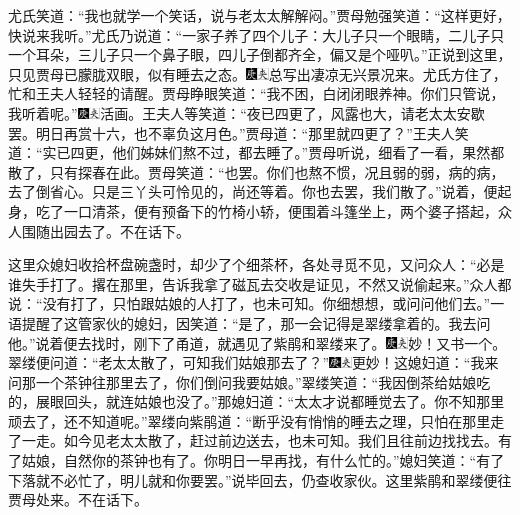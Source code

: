 尤氏笑道：“我也就学一个笑话，说与老太太解解闷。”贾母勉强笑道：“这样更好，快说来我听。”尤氏乃说道：“一家子养了四个儿子：大儿子只一个眼睛，二儿子只一个耳朵，三儿子只一个鼻子眼，四儿子倒都齐全，偏又是个哑叭。”正说到这里，只见贾母已朦胧双眼，似有睡去之态。{\includegraphics[width=3mm]{../Images/00004}\includegraphics[width=3mm]{../Images/00012}\footnotesize \kaishu 总写出凄凉无兴景况来。}尤氏方住了，忙和王夫人轻轻的请醒。贾母睁眼笑道：“我不困，白闭闭眼养神。你们只管说，我听着呢。”{\includegraphics[width=3mm]{../Images/00004}\includegraphics[width=3mm]{../Images/00012}\footnotesize \kaishu 活画。}王夫人等笑道：“夜已四更了，风露也大，请老太太安歇罢。明日再赏十六，也不辜负这月色。”贾母道：“那里就四更了？”王夫人笑道：“实已四更，他们姊妹们熬不过，都去睡了。”贾母听说，细看了一看，果然都散了，只有探春在此。贾母笑道：“也罢。你们也熬不惯，况且弱的弱，病的病，去了倒省心。只是三丫头可怜见的，尚还等着。你也去罢，我们散了。”说着，便起身，吃了一口清茶，便有预备下的竹椅小轿，便围着斗篷坐上，两个婆子搭起，众人围随出园去了。不在话下。

这里众媳妇收拾杯盘碗盏时，却少了个细茶杯，各处寻觅不见，又问众人：“必是谁失手打了。撂在那里，告诉我拿了磁瓦去交收是证见，不然又说偷起来。”众人都说：“没有打了，只怕跟姑娘的人打了，也未可知。你细想想，或问问他们去。”一语提醒了这管家伙的媳妇，因笑道：“是了，那一会记得是翠缕拿着的。我去问他。”说着便去找时，刚下了甬道，就遇见了紫鹃和翠缕来了。{\includegraphics[width=3mm]{../Images/00004}\includegraphics[width=3mm]{../Images/00012}\footnotesize \kaishu 妙！又书一个。}翠缕便问道：“老太太散了，可知我们姑娘那去了？”{\includegraphics[width=3mm]{../Images/00004}\includegraphics[width=3mm]{../Images/00012}\footnotesize \kaishu 更妙！}这媳妇道：“我来问那一个茶钟往那里去了，你们倒问我要姑娘。”翠缕笑道：“我因倒茶给姑娘吃的，展眼回头，就连姑娘也没了。”那媳妇道：“太太才说都睡觉去了。你不知那里顽去了，还不知道呢。”翠缕向紫鹃道：“断乎没有悄悄的睡去之理，只怕在那里走了一走。如今见老太太散了，赶过前边送去，也未可知。我们且往前边找找去。有了姑娘，自然你的茶钟也有了。你明日一早再找，有什么忙的。”媳妇笑道：“有了下落就不必忙了，明儿就和你要罢。”说毕回去，仍查收家伙。这里紫鹃和翠缕便往贾母处来。不在话下。

